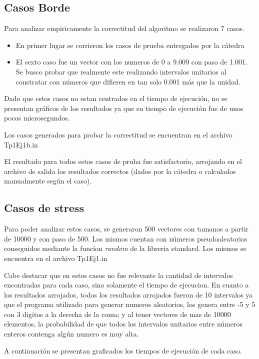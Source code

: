 \documentclass[a4paper, 12pt] {article}
\begin{document}
\subsection*{Casos Borde}
Para analizar empiricamente la correctitud del algoritmo se realizaron 7 casos.

\begin{itemize}
\item En primer lugar se corrieron los casos de prueba entregados por la c\'atedra
\item El sexto caso fue un vector con los numeros de 0 a 9.009 con paso de 1.001. Se busco probar que realmente este realizando intervalos unitarios al constratar con n\'umeros que difieren en tan solo 0.001 m\'as que la unidad.
\end{itemize}

Dado que estos casos no estan centrados en el tiempo de ejecuci\'on, no se presentan gr\'aficos de los resultados ya que su tiempo de ejecuci\'on fue de unos pocos microsegundos. 

Los casos generados para probar la correctitud se encuentran en el archivo Tp1Ej1b.in

El resultado para todos estos casos de pruba fue satisfactorio, arrojando en el archivo de salida los resultados correctos (dados por la c\'atedra o calculados manualmente seg\'un el caso).


\subsection*{Casos de stress}
Para poder analizar estos casos, se generaron 500 vectores con tamanos a partir de 10000 y con paso de 500. Los mismos cuentan con n\'umeros pseudoaleatorios conseguidos mediante la funcion \emph{random} de la libreria standard.
Los mismos se encuentra en el archivo Tp1Ej1.in

Cabe destacar que en estos casos no fue relevante la cantidad de intervalos encontradas para cada caso, sino solamente el tiempo de ejecucion. En cuanto a los resultados arrojados, todos los resultados arrojados fueron de 10 intervalos ya que el programa utilizado para generar numeros aleatorios, los genera entre -5 y 5 con 3 digitos a la derecha de la coma; y al tener vectores de mas de 10000 elementos, la probabilidad de que todos los intervalos unitarios entre n\'umeros enteros contenga alg\'un numero es muy alta.

A continuaci\'on se presentan graficados los tiempos de ejecuci\'on de cada caso.
\end{document}
